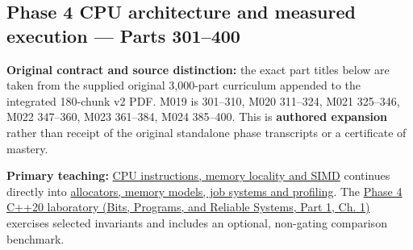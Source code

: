 \subsection{Phase 4 CPU architecture and measured execution --- Parts 301--400}\label{appendix-fd090d982a15-phase-4-cpu-architecture-and-measured-execution-parts-301400}

\hypertarget{appendix-fd090d982a15-phase-4-cpu-architecture-and-measured-execution-parts-301400}{}

\textbf{Original contract and source distinction:} the exact part titles below are taken from the supplied original 3,000-part curriculum appended to the integrated 180-chunk v2 PDF. M019 is 301--310, M020 311--324, M021 325--346, M022 347--360, M023 361--384, M024 385--400. This is \textbf{authored expansion} rather than receipt of the original standalone phase transcripts or a certificate of mastery.

\textbf{Primary teaching:} \hyperref[01-foundations-i-ch007-from-a-correct-c-asset-service-to-the-instructions-a-cpu-can-execute-phase-4-m019m021-parts-301346]{CPU instructions, memory locality and SIMD} continues directly into \hyperref[01-foundations-i-ch007-from-temporary-memory-to-finished-parallel-frames-phase-4-m022m024-parts-347400]{allocators, memory models, job systems and profiling}. The \href{../01-Bits-Programs-and-Reliable-Systems-P01/main.pdf\#nameddest=source-file-0060a91bd24dd25d6c14e679}{Phase 4 C++20 laboratory (Bits, Programs, and Reliable Systems, Part 1, Ch. 1)} exercises selected invariants and includes an optional, non-gating comparison benchmark.

